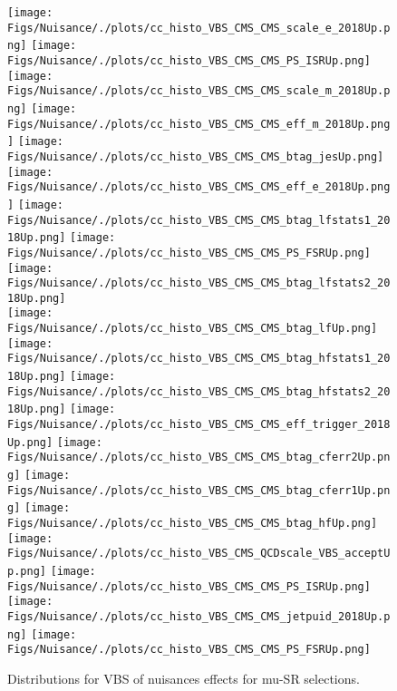 


\begin{figure*}[htbp]  
\centering 
\texttt{[image: Figs/Nuisance/./plots/cc\_histo\_VBS\_CMS\_CMS\_scale\_e\_2018Up.png]}
\texttt{[image: Figs/Nuisance/./plots/cc\_histo\_VBS\_CMS\_CMS\_PS\_ISRUp.png]}
\texttt{[image: Figs/Nuisance/./plots/cc\_histo\_VBS\_CMS\_CMS\_scale\_m\_2018Up.png]}
\texttt{[image: Figs/Nuisance/./plots/cc\_histo\_VBS\_CMS\_CMS\_eff\_m\_2018Up.png]}
\texttt{[image: Figs/Nuisance/./plots/cc\_histo\_VBS\_CMS\_CMS\_btag\_jesUp.png]}
\texttt{[image: Figs/Nuisance/./plots/cc\_histo\_VBS\_CMS\_CMS\_eff\_e\_2018Up.png]}
\texttt{[image: Figs/Nuisance/./plots/cc\_histo\_VBS\_CMS\_CMS\_btag\_lfstats1\_2018Up.png]}
\texttt{[image: Figs/Nuisance/./plots/cc\_histo\_VBS\_CMS\_CMS\_PS\_FSRUp.png]}
\texttt{[image: Figs/Nuisance/./plots/cc\_histo\_VBS\_CMS\_CMS\_btag\_lfstats2\_2018Up.png]}\\
\texttt{[image: Figs/Nuisance/./plots/cc\_histo\_VBS\_CMS\_CMS\_btag\_lfUp.png]}
\texttt{[image: Figs/Nuisance/./plots/cc\_histo\_VBS\_CMS\_CMS\_btag\_hfstats1\_2018Up.png]}
\texttt{[image: Figs/Nuisance/./plots/cc\_histo\_VBS\_CMS\_CMS\_btag\_hfstats2\_2018Up.png]}
\texttt{[image: Figs/Nuisance/./plots/cc\_histo\_VBS\_CMS\_CMS\_eff\_trigger\_2018Up.png]}
\texttt{[image: Figs/Nuisance/./plots/cc\_histo\_VBS\_CMS\_CMS\_btag\_cferr2Up.png]}
\texttt{[image: Figs/Nuisance/./plots/cc\_histo\_VBS\_CMS\_CMS\_btag\_cferr1Up.png]}
\texttt{[image: Figs/Nuisance/./plots/cc\_histo\_VBS\_CMS\_CMS\_btag\_hfUp.png]}
\texttt{[image: Figs/Nuisance/./plots/cc\_histo\_VBS\_CMS\_QCDscale\_VBS\_acceptUp.png]}
\texttt{[image: Figs/Nuisance/./plots/cc\_histo\_VBS\_CMS\_CMS\_PS\_ISRUp.png]}\\
\texttt{[image: Figs/Nuisance/./plots/cc\_histo\_VBS\_CMS\_CMS\_jetpuid\_2018Up.png]}
\texttt{[image: Figs/Nuisance/./plots/cc\_histo\_VBS\_CMS\_CMS\_PS\_FSRUp.png]}
\\ 
\caption{ 
   Distributions for VBS of nuisances effects for mu-SR selections.
} 
\label{fig:VBS_mu_SR} 
\end{figure*} 





